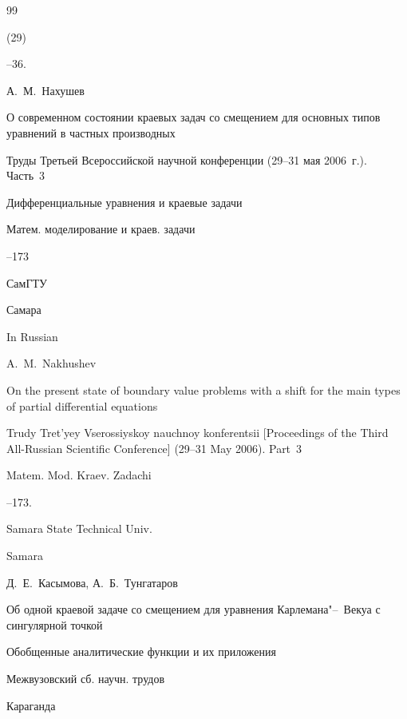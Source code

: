 \begin{thebibliography}{99}

(29)

--36.




\by А.~М.~Нахушев

\paper О современном состоянии краевых задач со смещением для основных типов уравнений в частных производных

\inbook Труды Третьей Всероссийской научной конференции \rm (29--31 мая 2006~г.). Часть~3

\bookinfo Дифференциальные уравнения и краевые задачи

\serial Матем. моделирование и краев. задачи


--173

\publ СамГТУ

\publaddr Самара


\misctransl 

\lang In Russian

\by A.~M.~Nakhushev

\paper On the present state of boundary value problems with a shift for the main types of partial differential equations

\inbook Trudy Tret'yey Vserossiyskoy nauchnoy konferentsii \rm [Proceedings of the Third All-Russian Scientific Conference] (29--31 May 2006). Part~3

\serial Matem. Mod. Kraev. Zadachi


--173.

\publ Samara State Technical Univ.

\publaddr Samara












\by Д.~Е.~Касымова, А.~Б.~Тунгатаров

\paper  Об одной краевой задаче со смещением для уравнения Карлемана"--~Векуа с сингулярной точкой

\inbook Обобщенные аналитические функции и их приложения

\bookinfo Межвузовский сб. научн. трудов

\publaddr Караганда


\end{thebibliography}
